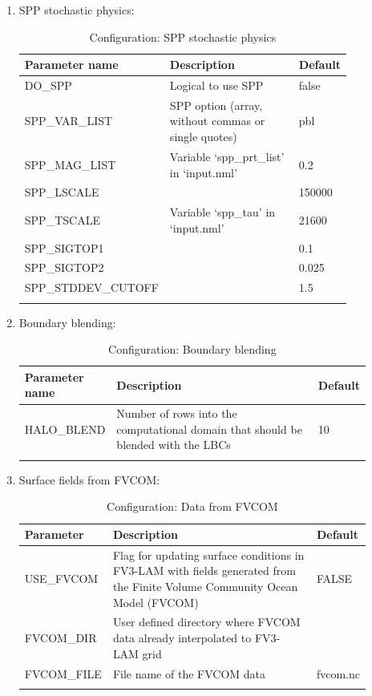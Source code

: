 \documentclass[11pt,fleqn]{report}              %
\begin{document}
\begin{enumerate}
\item SPP stochastic physics:
{
\scriptsize
\begin{longtable}{ p{0.22\linewidth} | p{0.55\linewidth} | p{0.08\linewidth}}
\hline
\hline
Parameter name & Description & Default \\
\hline
 DO\_SPP & Logical to use SPP & false \\
 SPP\_VAR\_LIST & SPP option (array, without commas or single quotes) & pbl \\
 SPP\_MAG\_LIST & Variable `spp\_prt\_list' in `input.nml' & 0.2 \\
 SPP\_LSCALE & & 150000 \\
 SPP\_TSCALE & Variable `spp\_tau' in `input.nml' & 21600 \\
 SPP\_SIGTOP1 & & 0.1 \\
 SPP\_SIGTOP2 & & 0.025 \\
 SPP\_STDDEV\_CUTOFF & & 1.5 \\
\hline
\caption{Configuration: SPP stochastic physics}
\label{table:config_spp_stoch}
\end{longtable}
}

\item Boundary blending:
{
\scriptsize
\begin{longtable}{ p{0.14\linewidth} | p{0.7\linewidth} | p{0.06\linewidth}}
\hline
\hline
 Parameter name & Description & Default \\
\hline
 HALO\_BLEND & Number of rows into the computational domain that should be blended with the LBCs & 10 \\
\hline
\caption{Configuration: Boundary blending}
\label{table:config_blend}
\end{longtable}
}

\item Surface fields from FVCOM:
{
\scriptsize
\begin{longtable}{ p{0.12\linewidth} | p{0.72\linewidth} | p{0.06\linewidth}}
\hline
\hline
 Parameter & Description & Default \\
\hline
 USE\_FVCOM & Flag for updating surface conditions in FV3-LAM with fields generated from the Finite Volume Community Ocean Model (FVCOM) & FALSE \\
 FVCOM\_DIR & User defined directory where FVCOM data already interpolated to FV3-LAM grid & \\
 FVCOM\_FILE & File name of the FVCOM data & fvcom.nc \\
\hline
\caption{Configuration: Data from FVCOM}
\label{table:config_fvcom}
\end{longtable}
}


\end{enumerate}
\end{document}
